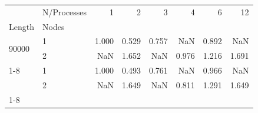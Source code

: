 \begin{tabular}{llrrrrrr}
\toprule
 & N/Processes & 1 & 2 & 3 & 4 & 6 & 12 \\
Length & Nodes &  &  &  &  &  &  \\
\midrule
\multirow[t]{2}{*}{90000} & 1 & 1.000 & 0.529 & 0.757 & NaN & 0.892 & NaN \\
 & 2 & NaN & 1.652 & NaN & 0.976 & 1.216 & 1.691 \\
\cline{1-8}
\multirow[t]{2}{*}{150000} & 1 & 1.000 & 0.493 & 0.761 & NaN & 0.966 & NaN \\
 & 2 & NaN & 1.649 & NaN & 0.811 & 1.291 & 1.649 \\
\cline{1-8}
\bottomrule
\end{tabular}
